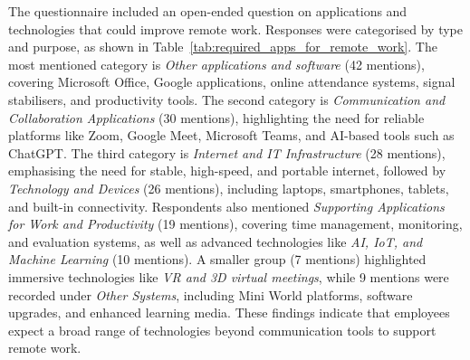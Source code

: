 \documentclass[a4paper, conference]{IEEEtran}
\begin{document}
The questionnaire included an open-ended question on applications and technologies that could improve remote work. Responses were categorised by type and purpose, as shown in Table~\ref{tab:required_apps_for_remote_work}. The most mentioned category is \textit{Other applications and software} (42 mentions), covering Microsoft Office, Google applications, online attendance systems, signal stabilisers, and productivity tools. The second category is \textit{Communication and Collaboration Applications} (30 mentions), highlighting the need for reliable platforms like Zoom, Google Meet, Microsoft Teams, and AI-based tools such as ChatGPT. The third category is \textit{Internet and IT Infrastructure} (28 mentions), emphasising the need for stable, high-speed, and portable internet, followed by \textit{Technology and Devices} (26 mentions), including laptops, smartphones, tablets, and built-in connectivity. Respondents also mentioned \textit{Supporting Applications for Work and Productivity} (19 mentions), covering time management, monitoring, and evaluation systems, as well as advanced technologies like \textit{AI, IoT, and Machine Learning} (10 mentions). A smaller group (7 mentions) highlighted immersive technologies like \textit{VR and 3D virtual meetings}, while 9 mentions were recorded under \textit{Other Systems}, including Mini World platforms, software upgrades, and enhanced learning media. These findings indicate that employees expect a broad range of technologies beyond communication tools to support remote work.
\end{document}

